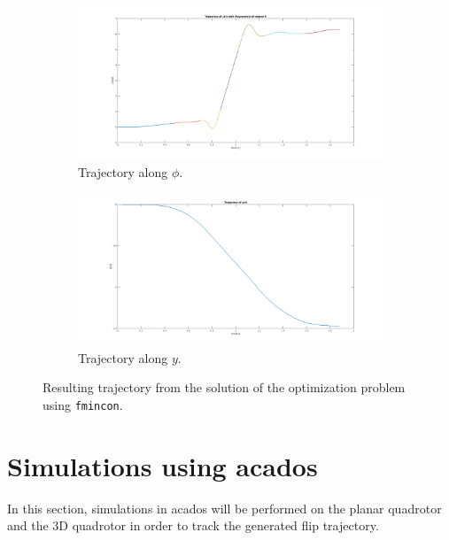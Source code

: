\documentclass{thesisreport}
\begin{document}
\begin{figure}[h]
\medskip
	\begin{subfigure}{0.48\textwidth}
		\includegraphics[width=\linewidth]{Images/optimization/phi.png}
		\caption{Trajectory along $\phi$.} \label{fig:phi_fmincon}
	\end{subfigure}\hspace*{\fill}
	\begin{subfigure}{0.48\textwidth}
		\includegraphics[width=\linewidth]{Images/optimization/y}
		\caption{Trajectory along $y$.} \label{fig:y_fmincon}
	\end{subfigure}

	\caption{Resulting trajectory from the solution of the optimization problem using \texttt{fmincon}.} \label{fig:trajectory_fmincon}
\end{figure}

\newpage

\section{Simulations using acados}

In this section, simulations in acados will be performed on the planar quadrotor and the 3D quadrotor in order to track the generated flip trajectory.
\end{document}
